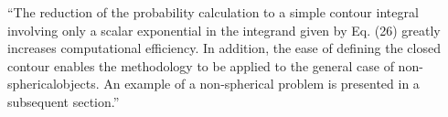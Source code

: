 ``The reduction of the probability calculation to a simple contour integral involving only a scalar exponential in the integrand given by Eq. (26) greatly increases computational efficiency. In addition, the ease of defining the closed contour enables the methodology to be applied to the general case of non-sphericalobjects. An example of a non-spherical problem is presented in a subsequent section.''







